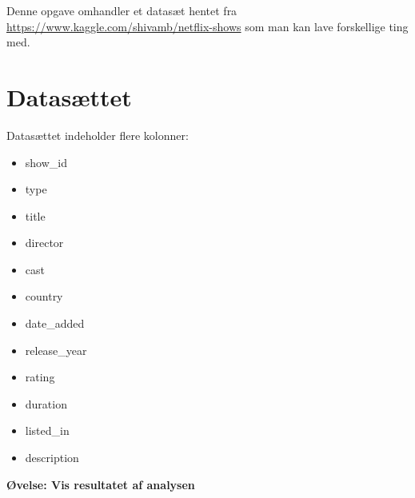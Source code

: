 \newcommand{\titel}{Netflix-titles}
\newcommand{\laerer}{andl}
\newcommand{\fag}{Programmering}
\newcommand{\sted}{EUC Nord - HTX Hj{\o}rring}






\maketitle

Denne opgave omhandler et datasæt hentet fra \url{https://www.kaggle.com/shivamb/netflix-shows} som man kan lave forskellige ting med.

\section{Datasættet}

Datasættet indeholder flere kolonner:
\begin{itemize}
  \item show\_id
  \item type
  \item title
  \item director
  \item cast
  \item country
  \item date\_added
  \item release\_year
  \item rating
  \item duration
  \item listed\_in
  \item description
\end{itemize}

\begin{mybox}
\textbf{Øvelse: Vis resultatet af analysen}

\end{mybox}


